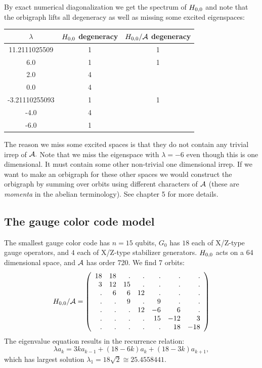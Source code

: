 \documentclass[12pt]{article}
\begin{document}
By exact%
numerical diagonalization
we get the spectrum of $H_{0,0}$ and note that the orbigraph lifts
all degeneracy as well as missing some excited eigenspaces:
\begin{center}
\begin{tabular}{ c|c|c } 
$\lambda$ & $H_{0,0}$ degeneracy & $H_{0,0}/\mathcal{A}$ degeneracy \\
\hline
    11.2111025509 & 1 & 1 \\
    6.0 & 1 & 1 \\
    2.0 & 4 &   \\
    0.0 & 4 &   \\
    -3.21110255093 & 1 & 1 \\
    -4.0 & 4 &   \\
    -6.0 & 1 &   
\end{tabular}
\end{center}
The reason we miss some excited spaces is that they do not contain
any trivial irrep of $\mathcal{A}.$
Note that we miss the eigenspace with $\lambda = -6$
even though this is one dimensional. It must contain some other non-trivial
one dimensional irrep. 
If we want to make an orbigraph for these other spaces we would construct
the orbigraph by
summing over orbits using different characters of $\mathcal{A}$
(these are \emph{momenta} in the abelian terminology).
See \cite{Cvetkovic1980} chapter 5 for more details.

%
\subsection{The gauge color code model}
The smallest gauge color code has $n=15$ qubits,
$G_0$ has $18$ each of X/Z-type gauge operators,
and $4$ each of X/Z-type stabilizer generators.
$H_{0,0}$ acts on a 64 dimensional space, and $\mathcal{A}$ has
order 720. We find 7 orbits:
$$
H_{0,0}/\mathcal{A} = 
\left(\begin{array}{rrrrrrr}
18 & 18 &  . &  . &  . &  . &  . \cr
  3 & 12 & 15 &  . &  . &  . &  . \cr
  . &  6 &  6 & 12 &  . &  . &  . \cr
  . &  . &  9 &  . &  9 &  . &  . \cr
  . &  . &  . & 12 & -6 &  6 &  . \cr
  . &  . &  . &  . & 15 & -12 &  3 \cr
  . &  . &  . &  . &  . & 18 & -18
\end{array}\right)
$$
The eigenvalue equation results in
the recurrence relation:
$$
    \lambda a_k = 3ka_{k-1} + (18-6k)a_k + (18-3k)a_{k+1},
$$
which has largest solution 
$\lambda_1 = 18\sqrt{2} \cong 25.4558441.$
\end{document}
